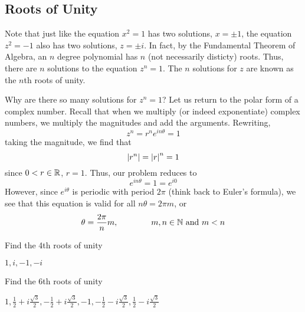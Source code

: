 \subsection{Roots of Unity}
Note that just like the equation \(x^2=1\) has two solutions, \(x=\pm 1\), the equation \(z^2=-1\) also has two solutions, \(z=\pm i\). In fact, by the Fundamental Theorem of Algebra, an \(n\) degree polynomial has \(n\) (not necessarily disticty) roots. Thus, there are \(n\) solutions to the equation \(z^n=1\). The \(n\) solutions for \(z\) are known as the \(n\)th roots of unity.

Why are there so many solutions for \(z^n=1\)? Let us return to the polar form of a complex number. Recall that when we multiply (or indeed exponentiate) complex numbers, we multiply the magnitudes and add the arguments. Rewriting, 
\[z^n = r^n e^{i n \theta } = 1\]
taking the magnitude, we find that 
\[\left|r^n\right| = \left|r\right|^n =1\]
since \(0<r\in\mathbb{R}\), \(r=1\). Thus, our problem reduces to
\[e^{i n\theta} = 1 = e^{i0}\]
However, since \(e^{i\theta}\) is periodic with period \(2\pi\) (think back to Euler's formula), we see that this equation is valid for all \(n\theta = 2\pi m\), or
\[\theta = \frac{2\pi}{n}{m}, \qquad\qquad m,n\in \mathbb{N}\text{\ and }m<n\]

\begin{exercise}
	Find the 4th roots of unity
\begin{solution}
	\(\boxed{1,i,-1,-i}\)	
\end{solution}
\end{exercise}
\begin{exercise}
	Find the 6th roots of unity
\begin{solution}
	\(\boxed{1, \frac{1}{2}+i\frac{\sqrt{3}}{2}, -\frac{1}{2}+i\frac{\sqrt{3}}{2},-1,-\frac{1}{2}-i\frac{\sqrt{3}}{2},\frac{1}{2}-i\frac{\sqrt{3}}{2}}\)
\end{solution}
\end{exercise}
